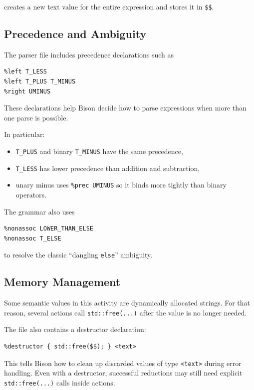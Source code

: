 \documentclass[12pt]{article}
\begin{document}
creates a new text value for the entire expression and stores it in \texttt{\$\$}.

\subsection*{Precedence and Ambiguity}

The parser file includes precedence declarations such as

\begin{lstlisting}
%left T_LESS
%left T_PLUS T_MINUS
%right UMINUS
\end{lstlisting}

These declarations help Bison decide how to parse expressions when more than one parse is possible.

In particular:
\begin{itemize}
    \item \texttt{T\_PLUS} and binary \texttt{T\_MINUS} have the same precedence,
    \item \texttt{T\_LESS} has lower precedence than addition and subtraction,
    \item unary minus uses \texttt{\%prec UMINUS} so it binds more tightly than binary operators.
\end{itemize}

The grammar also uses

\begin{lstlisting}
%nonassoc LOWER_THAN_ELSE
%nonassoc T_ELSE
\end{lstlisting}

to resolve the classic ``dangling \texttt{else}'' ambiguity.

\subsection*{Memory Management}

Some semantic values in this activity are dynamically allocated strings.
For that reason, several actions call \texttt{std::free(...)} after the value is no longer needed.

The file also contains a destructor declaration:

\begin{lstlisting}
%destructor { std::free($$); } <text>
\end{lstlisting}

This tells Bison how to clean up discarded values of type \texttt{<text>} during error handling. Even with a destructor, successful reductions may still need explicit \texttt{std::free(...)} calls inside actions.
\end{document}
